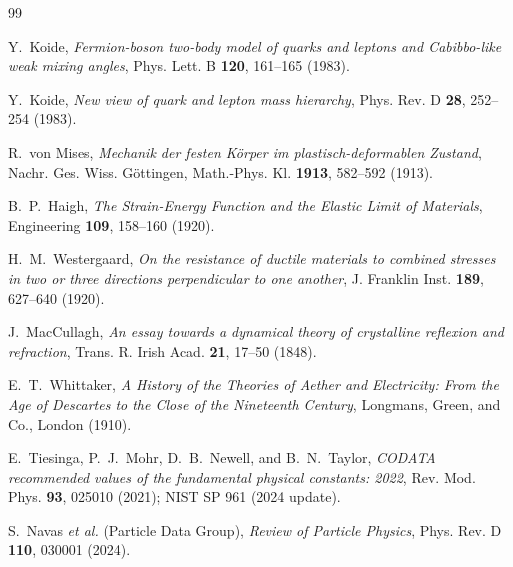 \documentclass[11pt,a4paper]{article}
\theoremstyle{definition}
\theoremstyle{remark}
\begin{document}
\begin{thebibliography}{99}

Y.~Koide, \textit{Fermion-boson two-body model of quarks and leptons and Cabibbo-like weak mixing angles}, Phys. Lett. B \textbf{120}, 161--165 (1983).

Y.~Koide, \textit{New view of quark and lepton mass hierarchy}, Phys. Rev. D \textbf{28}, 252--254 (1983).

R.~von Mises, \textit{Mechanik der festen K{\"o}rper im plastisch-deformablen Zustand}, Nachr. Ges. Wiss. G{\"o}ttingen, Math.-Phys. Kl. \textbf{1913}, 582--592 (1913).

B.~P.~Haigh, \textit{The Strain-Energy Function and the Elastic Limit of Materials}, Engineering \textbf{109}, 158--160 (1920).

H.~M.~Westergaard, \textit{On the resistance of ductile materials to combined stresses in two or three directions perpendicular to one another}, J. Franklin Inst. \textbf{189}, 627--640 (1920).

J.~MacCullagh, \textit{An essay towards a dynamical theory of crystalline reflexion and refraction}, Trans. R. Irish Acad. \textbf{21}, 17--50 (1848).

E.~T.~Whittaker, \textit{A History of the Theories of Aether and Electricity: From the Age of Descartes to the Close of the Nineteenth Century}, Longmans, Green, and Co., London (1910).

E.~Tiesinga, P.~J.~Mohr, D.~B.~Newell, and B.~N.~Taylor, \textit{CODATA recommended values of the fundamental physical constants: 2022}, Rev. Mod. Phys. \textbf{93}, 025010 (2021); NIST SP 961 (2024 update).

S.~Navas \textit{et al.} (Particle Data Group), \textit{Review of Particle Physics}, Phys. Rev. D \textbf{110}, 030001 (2024).

\end{thebibliography}
\end{document}
